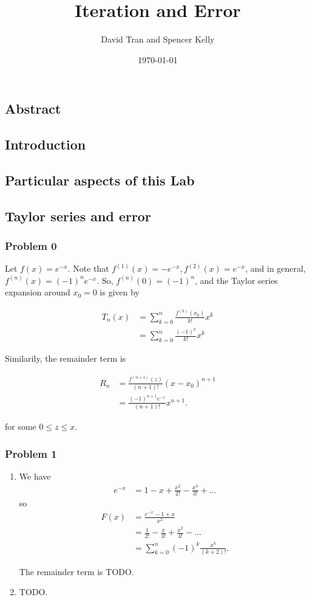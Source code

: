 \documentclass[letter,11pt]{article}
\title{Iteration and Error}
\author{David Tran and Spencer Kelly}
\date{\today}
\begin{document}
\maketitle

\subsection*{Abstract}

\subsection*{Introduction}

\subsection*{Particular aspects of this Lab }

\subsection*{Taylor series and error}
\subsubsection*{Problem 0}
Let $f(x) = e^{-x}$. Note that $f^{(1)}(x) = -e^{-x}, f^{(2)}(x) = e^{-x}$, and in general, $f^{(n)}(x) = (-1)^ne^{-x}$. So, $f^{(n)}(0) = (-1)^n$, and the Taylor series expansion around $x_0 = 0$ is given by

\begin{align*}
T_n(x) &= \sum_{k = 0}^n \frac{f^{(k)}(x_0)}{k!} x^k \\
&= \sum_{k = 0}^n \frac{(-1)^k}{k!}x^k
\end{align*}

Similarily, the remainder term is

\begin{align*}
R_n &= \frac{f^{(n + 1)}(z)}{(n + 1)!}(x - x_0)^{n + 1} \\
&= \frac{(-1)^{n + 1} e^{-z}}{(n + 1)!}x^{n + 1}.
\end{align*}

for some $0 \leq z \leq x$.

\subsubsection*{Problem 1}
\begin{enumerate}[label=\alph*.]
  \item We have \begin{align*}
    e^{-x} &= 1 - x + \frac{x^2}{2!} - \frac{x^3}{3!} + \dots
  \end{align*}
  so
  \begin{align*}
    F(x) &= \frac{e^{-x} - 1 + x}{x^2} \\
    &= \frac{1}{2!} - \frac{x}{3!} + \frac{x^2}{4!} - \dots \\
    &= \sum_{k = 0}^n (-1)^k \frac{x^k}{(k + 2)!}.
  \end{align*}

  The remainder term is TODO.
  \item TODO.
\end{enumerate}
\end{document}
